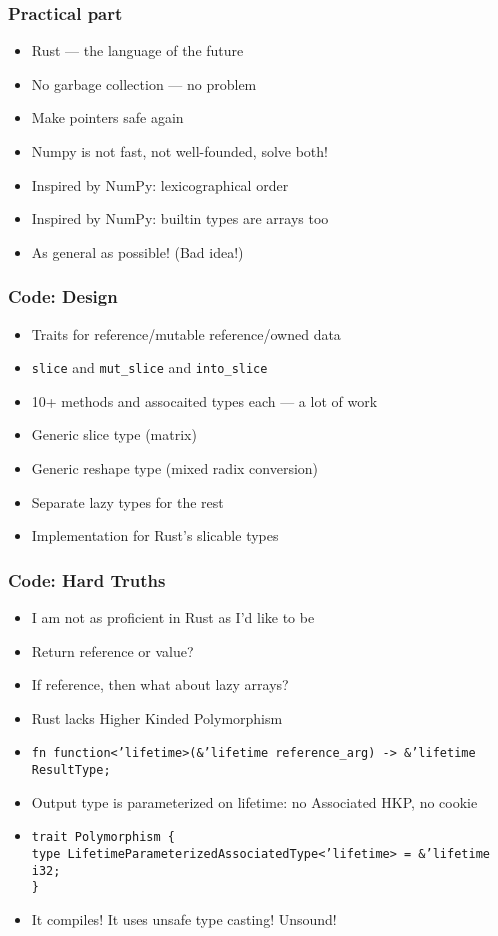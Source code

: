 \documentclass[xetex,mathserif,serif]{beamer}
\begin{document}
\begin{frame}
  \frametitle{Practical part}
  \pause
  \begin{itemize}[<+->]
    \item Rust --- the language of the future
    \item No garbage collection --- no problem
    \item Make pointers safe again
    \item Numpy is not fast, not well-founded, solve both!
    \item Inspired by NumPy: lexicographical order
    \item Inspired by NumPy: builtin types are arrays too
    \item As general as possible! (Bad idea!)
  \end{itemize}
\end{frame}

\begin{frame}
  \frametitle{Code: Design}
  \pause
  \begin{itemize}[<+->]
    \item Traits for reference/mutable reference/owned data
    \item \texttt{slice} and \texttt{mut\_slice} and \texttt{into\_slice}
    \item 10+ methods and assocaited types each --- a lot of work
    \item Generic slice type (matrix)
    \item Generic reshape type (mixed radix conversion)
    \item Separate lazy types for the rest
    \item Implementation for Rust's slicable types
  \end{itemize}
\end{frame}

\begin{frame}
  \frametitle{Code: Hard Truths}
  \pause
  \begin{itemize}[<+->]
    \item I am not as proficient in Rust as I'd like to be
    \item Return reference or value?
    \item If reference, then what about lazy arrays?
    \item Rust lacks Higher Kinded Polymorphism
    \item \texttt{fn function<'lifetime>(\&'lifetime reference\_arg) -> \&'lifetime ResultType;}
    \item Output type is parameterized on lifetime: no Associated HKP, no cookie
    \item \texttt{trait Polymorphism \{\\
            type LifetimeParameterizedAssociatedType<'lifetime> = \&'lifetime i32;\\
                  \}}
    \item It compiles! It uses unsafe type casting! Unsound!
  \end{itemize}
\end{frame}
\end{document}
